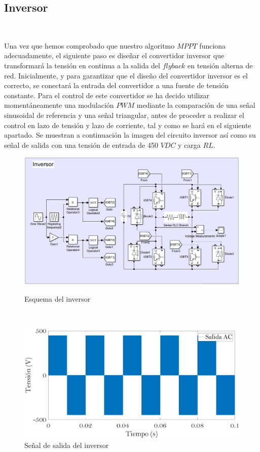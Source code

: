 \documentclass[	DIV=calc,%
							paper=letter,%
							fontsize=12pt%
                            ]{scrartcl}	 					%
\begin{document}
\subsection{Inversor }

\hfill
\

Una vez que hemos comprobado que nuestro algoritmo $MPPT$ funciona adecuadamente, el siguiente paso es diseñar el convertidor inversor que transformará la tensión en continua a la salida del $flyback$ en tensión alterna de red. Inicialmente, y para garantizar que el diseño del convertidor inversor es el correcto, se conectará la entrada del convertidor a una fuente de tensión constante. Para el control de este convertidor se ha decido utilizar momentáneamente  una modulación $PWM$ mediante la comparación de una señal sinusoidal de referencia y una señal triangular, antes de proceder a realizar el control en lazo de tensión y lazo de corriente, tal y como se hará en el siguiente apartado. Se muestran a continuación la imagen del circuito inversor así como su señal de salida con una tensión de entrada de 450 $VDC$ y carga $RL$.

\newpage

\begin{figure}[h]
\centering
\includegraphics[scale=0.4]{inv_fly}
\caption{Esquema del inversor}

\hfill
\

\includegraphics[scale=0.3]{salida}
\caption{Señal de salida del inversor}
\end{figure}
\end{document}
